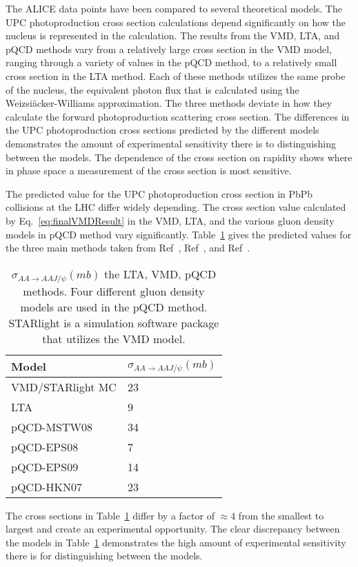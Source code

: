     The ALICE data points have been compared to several theoretical models. 
  The UPC photoproduction cross section calculations depend significantly on 
    how the nucleus is represented in the calculation. 
  The results from the VMD, LTA, and pQCD methods vary from a relatively 
    large cross section in the VMD model, ranging through a variety of values
    in the pQCD method, to a relatively small cross section in the LTA method. 
  Each of these methods utilizes the same probe of the nucleus, the equivalent 
    photon flux that is calculated using the Weizsi\"{a}cker-Williams approximation. 
  The three methods deviate in how they calculate the forward photoproduction
    scattering cross section.
  The differences in the UPC photoproduction cross sections predicted by the 
    different models demonstrates the amount of experimental sensitivity there 
    is to distinguishing between the models. 
  The dependence of the cross section on rapidity shows where in phase space 
    a measurement of the cross section is most sensitive.
   
  The predicted value for the UPC \JPsi{} photoproduction cross section in 
    PbPb collisions at the LHC differ widely depending.
  The cross section value calculated by Eq.~\ref{eq:finalVMDResult} in the 
    VMD, LTA, and the various gluon density models in pQCD method vary 
    significantly.
  Table~\ref{tab:allXsec} gives the predicted values for the three main methods
    taken from Ref~\cite{pQCD2013.02}, Ref~\cite{lta2011.09}, and Ref~\cite{vmd1999}.
  \begin{table} 
   \centering
   \begin{tabular}{|l|l|} 
     \hline
     Model & $\sigma_{AA\rightarrow AAJ/\psi} (mb)$ \\ \hline \hline
     VMD/STARlight MC & 23 \\ \hline
     LTA & 9 \\ \hline
     pQCD-MSTW08 & 34 \\ \hline
     pQCD-EPS08 & 7  \\ \hline
     pQCD-EPS09 & 14 \\ \hline
     pQCD-HKN07 & 23 \\ \hline
     \hline
   \end{tabular}
   \caption{$\sigma_{AA\rightarrow AAJ/\psi} (mb)$
    the LTA, VMD, pQCD methods. Four different gluon density models are used 
    in the pQCD method. STARlight is a simulation software package that utilizes 
    the VMD model.}
   \label{tab:allXsec}
  \end{table}
  The cross sections in Table~\ref{tab:allXsec} differ by a factor of $\approx4$ 
    from the smallest to largest and create an experimental opportunity. 
  The clear discrepancy between the models in Table~\ref{tab:allXsec} 
    demonstrates the high amount of experimental sensitivity there is for 
    distinguishing between the models. 

